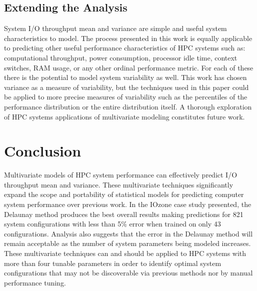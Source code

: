 \documentclass{scspaperproc}
\theoremstyle{scsthe}
\begin{document}
\vspace{-10pt}
\subsection{Extending the Analysis}
\vspace{-10pt}
System I/O throughput mean and variance are simple and useful system
characteristics to model. The process presented in this work is
equally applicable to predicting other useful performance
characteristics of HPC systems such as: computational throughput,
power consumption, processor idle time, context switches, RAM usage,
or any other ordinal performance metric. For each of these there is
the potential to model system variability as well. This work has
chosen variance as a measure of variability, but the techniques used
in this paper could be applied to more precise measures of variability
such as the percentiles of the performance distribution or the entire
distribution itself. A thorough exploration of HPC systems
applications of multivariate modeling constitutes future work.


\section{Conclusion}
\label{sec:conclusion}
Multivariate models of HPC system performance can effectively predict
I/O throughput mean and variance. These multivariate techniques
significantly expand the scope and portability of statistical models
for predicting computer system performance over previous work. In the
IOzone case study presented, the Delaunay method produces the best
overall results making predictions for 821 system configurations with
less than 5\% error when trained on only 43 configurations. Analysis
also suggests that the error in the Delaunay method will remain
acceptable as the number of system parameters being modeled
increases. These multivariate techniques can and should be applied to
HPC systems with more than four tunable parameters in order to
identify optimal system configurations that may not be discoverable
via previous methods nor by manual performance tuning.
\end{document}
